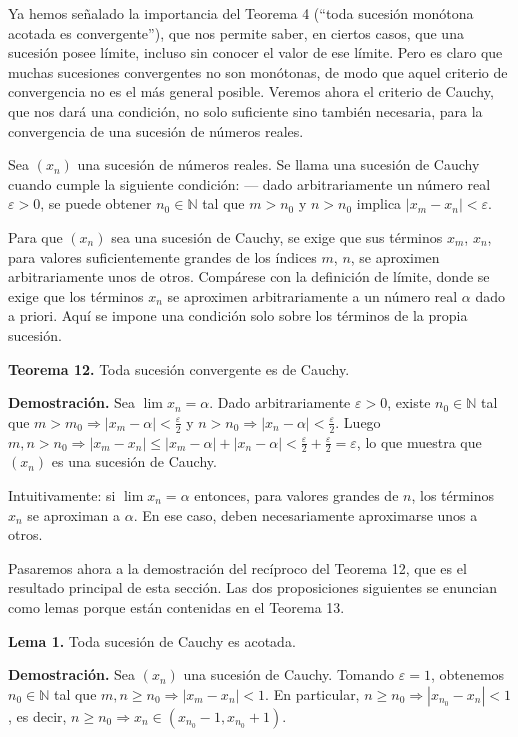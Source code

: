 \documentclass[12pt,oneside]{book}
\begin{document}
Ya hemos señalado la importancia del Teorema 4 (“toda sucesión monótona acotada es convergente”), que nos permite saber, en ciertos casos, que una sucesión posee límite, incluso sin conocer el valor de ese límite. Pero es claro que muchas sucesiones convergentes no son monótonas, de modo que aquel criterio de convergencia no es el más general posible. Veremos ahora el criterio de Cauchy, que nos dará una condición, no solo suficiente sino también necesaria, para la convergencia de una sucesión de números reales.

Sea \((x_n)\) una sucesión de números reales. Se llama una sucesión de Cauchy cuando cumple la siguiente condición:
— dado arbitrariamente un número real \(\varepsilon > 0\), se puede obtener \(n_0 \in \mathbb{N}\) tal que \(m > n_0\) y \(n > n_0\) implica \(|x_m - x_n| < \varepsilon\).

Para que \((x_n)\) sea una sucesión de Cauchy, se exige que sus términos \(x_m\), \(x_n\), para valores suficientemente grandes de los índices \(m\), \(n\), se aproximen arbitrariamente unos de otros. Compárese con la definición de límite, donde se exige que los términos \(x_n\) se aproximen arbitrariamente a un número real \(\alpha\) dado a priori. Aquí se impone una condición solo sobre los términos de la propia sucesión.

\textbf{Teorema 12.} Toda sucesión convergente es de Cauchy.

\textbf{Demostración.} Sea \(\lim x_n = \alpha\). Dado arbitrariamente \(\varepsilon > 0\), existe \(n_0 \in \mathbb{N}\) tal que \(m > m_0 \Rightarrow |x_m - \alpha| < \frac{\varepsilon}{2}\) y \(n > n_0 \Rightarrow |x_n - \alpha| < \frac{\varepsilon}{2}\). Luego \(m, n > n_0 \Rightarrow |x_m - x_n| \leq |x_m - \alpha| + |x_n - \alpha| < \frac{\varepsilon}{2} + \frac{\varepsilon}{2} = \varepsilon\), lo que muestra que \((x_n)\) es una sucesión de Cauchy.

Intuitivamente: si \(\lim x_n = \alpha\) entonces, para valores grandes de \(n\), los términos \(x_n\) se aproximan a \(\alpha\). En ese caso, deben necesariamente aproximarse unos a otros.

Pasaremos ahora a la demostración del recíproco del Teorema 12, que es el resultado principal de esta sección. Las dos proposiciones siguientes se enuncian como lemas porque están contenidas en el Teorema 13.

\textbf{Lema 1.} Toda sucesión de Cauchy es acotada.

\textbf{Demostración.} Sea \((x_n)\) una sucesión de Cauchy. Tomando \(\varepsilon = 1\), obtenemos \(n_0 \in \mathbb{N}\) tal que \(m, n \geq n_0 \Rightarrow |x_m - x_n| < 1\). En particular, \(n \geq n_0 \Rightarrow |x_{n_0} - x_n| < 1\), es decir, \(n \geq n_0 \Rightarrow x_n \in (x_{n_0} - 1, x_{n_0} + 1)\).
\end{document}

